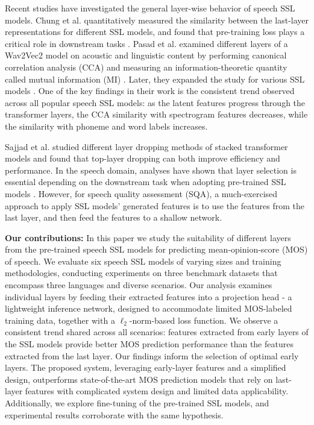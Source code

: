 \documentclass[conference]{IEEEtran}
\begin{document}
Recent studies have investigated the general layer-wise behavior of speech SSL models. Chung et al. quantitatively measured the similarity between the last-layer representations for different SSL models, and found that pre-training loss plays a critical role in downstream tasks \cite{chung2021similarity}. Pasad et al. examined different layers of a Wav2Vec2 model on acoustic and linguistic content by performing canonical correlation analysis (CCA) and measuring an information-theoretic quantity called mutual information (MI) \cite{pasad2021layer}. Later, they expanded the study for various SSL models \cite{pasad2023comparative}. One of the key findings in their work is the consistent trend observed across all popular speech SSL models: as the latent features progress through the transformer layers, the CCA similarity with spectrogram features decreases, while the similarity with phoneme and word labels increases.

Sajjad et al. \cite{sajjad2020poor} studied different layer dropping methods of stacked transformer models and found that top-layer dropping can both improve efficiency and performance. In the speech domain, analyses have shown that layer selection is essential depending on the downstream task when adopting pre-trained SSL models \cite{fan2020exploring, wavlm, SUPERB}. However, for speech quality assessment (SQA), a much-exercised approach to apply SSL models' generated features is to use the features from the last layer, and then feed the features to a shallow network. 

\noindent\textbf{Our contributions:} In this paper we study the suitability of different layers from the pre-trained speech SSL models for predicting mean-opinion-score (MOS) of speech. We evaluate six speech SSL models of varying sizes and training methodologies, conducting experiments on three benchmark datasets that encompass three languages and diverse scenarios. Our analysis examines individual layers by feeding their extracted features into a projection head - a lightweight inference network, designed to accommodate limited MOS-labeled training data, together with a $\ell_2$-norm-based loss function. We observe a consistent trend shared across all scenarios: features extracted from early layers of the SSL models provide better MOS prediction performance than the features extracted from the last layer. Our findings inform the selection of optimal early layers. The proposed system, leveraging early-layer features and a simplified design, outperforms state-of-the-art MOS prediction models that rely on last-layer features with complicated system design and limited data applicability. Additionally, we explore fine-tuning of the pre-trained SSL models, and experimental results corroborate with the same hypothesis.
\end{document}
